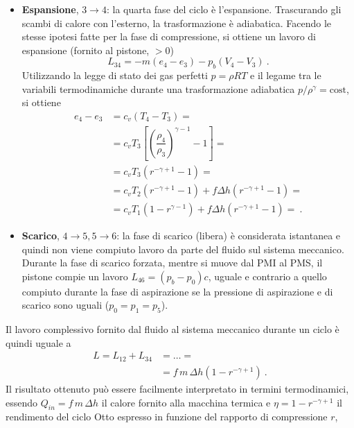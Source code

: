 \begin{itemize}
\item \textbf{Espansione}, $3 \rightarrow 4$: la quarta fase del ciclo è l'espansione. Trascurando gli scambi di calore con l'esterno, la trasformazione è adiabatica. Facendo le stesse ipotesi fatte per la fase di compressione, si ottiene un lavoro di espansione (fornito al pistone, $>0$)
\begin{equation}
 L_{34} = -m (e_4-e_3) - p_b ( V_4 - V_3 ) \ .
\end{equation}
Utilizzando la legge di stato dei gas perfetti $p = \rho R T$ e il legame tra le variabili termodinamiche durante una trasformazione adiabatica $p/\rho^\gamma = \text{cost}$, si ottiene
\begin{equation}
\begin{aligned}
 e_4 - e_3 & = c_v ( T_4 - T_3 ) = \\
  & = c_v T_3 \left[ \left( \dfrac{\rho_4}{\rho_3} \right)^{\gamma-1} - 1 \right] = \\
  & = c_v T_3 \left( r^{-\gamma+1} - 1\right) = \\
  & = c_v T_2 \left( r^{-\gamma+1} - 1\right) +
   f \Delta h \left( r^{-\gamma+1} - 1\right)  = \\ 
  & = c_v T_1 \left( 1 - r^{ \gamma-1}\right) +
   f \Delta h \left( r^{-\gamma+1} - 1\right)  = \ .
\end{aligned}
\end{equation}

\item \textbf{Scarico}, $4 \rightarrow 5, 5 \rightarrow 6$: la fase di scarico (libera) è considerata istantanea e quindi non viene compiuto lavoro da parte del fluido sul sistema meccanico. Durante la fase di scarico forzata, mentre si muove dal PMI al PMS, il pistone compie un lavoro $L_{46} = (p_b - p_0) c$, uguale e contrario a quello compiuto durante la fase di aspirazione se la pressione di aspirazione e di scarico sono uguali ($p_0 = p_1 = p_5$).

\end{itemize} \vspace{0.2cm}
%
\noindent
Il lavoro complessivo fornito dal fluido al sistema meccanico durante un ciclo è quindi uguale a 
\begin{equation}
\begin{aligned}
 L = L_{12} + L_{34} & = \dots = \\
 & = f \, m \, \Delta h \left( 1 - r^{-\gamma+1}\right)  \ .
\end{aligned}
\end{equation}
Il risultato ottenuto può essere facilmente interpretato in termini termodinamici, essendo $Q_{in} = f \, m \, \Delta h$ il calore fornito alla macchina termica e $\eta = 1 - r^{-\gamma+1}$ il rendimento del ciclo Otto espresso in funzione del rapporto di compressione $r$,

